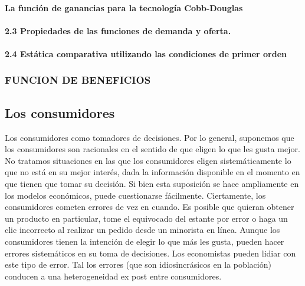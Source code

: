 \documentclass[
]{article}
\begin{document}
\hypertarget{la-funciuxf3n-de-ganancias-para-la-tecnologuxeda-cobb-douglas}{%
\paragraph{La función de ganancias para la tecnología
Cobb-Douglas}\label{la-funciuxf3n-de-ganancias-para-la-tecnologuxeda-cobb-douglas}}

\hypertarget{propiedades-de-las-funciones-de-demanda-y-oferta.}{%
\paragraph{2.3 Propiedades de las funciones de demanda y
oferta.}\label{propiedades-de-las-funciones-de-demanda-y-oferta.}}

\hypertarget{estuxe1tica-comparativa-utilizando-las-condiciones-de-primer-orden}{%
\paragraph{2.4 Estática comparativa utilizando las condiciones de primer
orden}\label{estuxe1tica-comparativa-utilizando-las-condiciones-de-primer-orden}}

\hypertarget{funcion-de-beneficios}{%
\subsubsection{FUNCION DE BENEFICIOS}\label{funcion-de-beneficios}}

\hypertarget{los-consumidores}{%
\subsection{Los consumidores}\label{los-consumidores}}

Los consumidores como tomadores de decisiones. Por lo general, suponemos
que los consumidores son racionales en el sentido de que eligen lo que
les gusta mejor. No tratamos situaciones en las que los consumidores
eligen sistemáticamente lo que no está en su mejor interés, dada la
información disponible en el momento en que tienen que tomar su
decisión. Si bien esta suposición se hace ampliamente en los modelos
económicos, puede cuestionarse fácilmente. Ciertamente, los consumidores
cometen errores de vez en cuando. Es posible que quieran obtener un
producto en particular, tome el equivocado del estante por error o haga
un clic incorrecto al realizar un pedido desde un minorista en línea.
Aunque los consumidores tienen la intención de elegir lo que más les
gusta, pueden hacer errores sistemáticos en su toma de decisiones. Los
economistas pueden lidiar con este tipo de error. Tal los errores (que
son idiosincrásicos en la población) conducen a una heterogeneidad ex
post entre consumidores.
\end{document}
